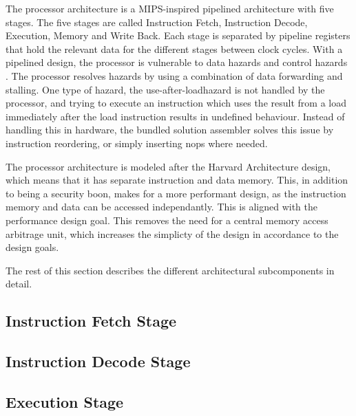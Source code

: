 
The processor architecture is a MIPS-inspired pipelined architecture with five stages.
The five stages are called Instruction Fetch, Instruction Decode, Execution, Memory and Write Back.
Each stage is separated by pipeline registers that hold the relevant data for the different stages between clock cycles.
With a pipelined design, the processor is vulnerable to data hazards and control hazards .
The processor resolves hazards by using a combination of data forwarding and stalling.
One type of hazard, the use-after-load\cn hazard is not handled by the processor, and trying to execute an instruction which uses the result from a load immediately after the load instruction results in undefined behaviour.
Instead of handling this in hardware, the bundled solution assembler solves this issue by instruction reordering, or simply inserting nops where needed.

The processor architecture is modeled after the Harvard Architecture design, which means that it has separate instruction and data memory.
This, in addition to being a security boon, makes for a more performant design, as the instruction memory and data can be accessed independantly.
This is aligned with the performance design goal.
This removes the need for a central memory access arbitrage unit, which increases the simplicty of the design in accordance to the design goals\cn.


The rest of this section describes the different architectural subcomponents in detail.

\subsection{Instruction Fetch Stage}
    

\subsection{Instruction Decode Stage}
    

\subsection{Execution Stage}
    

